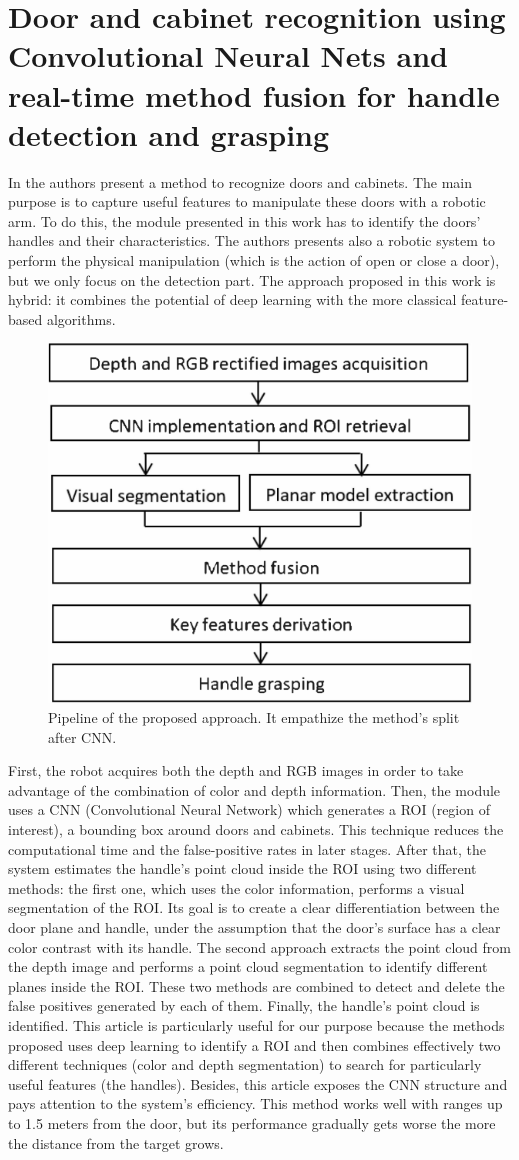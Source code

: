 \section{Door and cabinet recognition using Convolutional Neural Nets and real-time method fusion for handle detection and grasping \cite{7942676}}
In \cite{7942676} the authors present a method to recognize doors and cabinets. The main purpose is to capture useful features to manipulate these doors with a robotic arm. To do this, the module presented in this work has to identify the doors' handles and their characteristics. The authors presents also a robotic system to perform the physical manipulation (which is the action of open or close a door), but we only focus on the detection part. The approach proposed in this work is hybrid: it combines the potential of deep learning with the more classical feature-based algorithms. 

\begin{figure}[h!]
	\centering
	\includegraphics[width=0.4\linewidth]{images/method_overview.png}
	\caption{Pipeline of the proposed approach. It empathize the method's split after CNN.}
\end{figure}

First, the robot acquires both the depth and RGB images in order to take advantage of the combination of color and depth information. Then, the module uses a CNN (Convolutional Neural Network) which generates a ROI (region of interest), a bounding box around doors and cabinets. This technique reduces the computational time and the false-positive rates in later stages. After that, the system estimates the handle's point cloud inside the ROI using two different methods: the first one, which uses the color information, performs a visual segmentation of the ROI. Its goal is to create a clear differentiation between
the door plane and handle, under the assumption that the door's surface has a clear
color contrast with its handle. The second approach extracts the point cloud from the depth image and performs a point cloud segmentation to identify different planes inside the ROI. These two methods are combined to detect and delete the false positives generated by each of them. Finally, the handle's point cloud is identified. This article is particularly useful for our purpose because the methods proposed uses deep learning to identify a ROI and then combines effectively two different techniques (color and depth segmentation) to search for particularly useful features (the handles). Besides, this article exposes the CNN structure and pays attention to the system's efficiency. This method works well with ranges up to 1.5 meters from the door, but its performance gradually gets worse the more the distance from the target grows.

